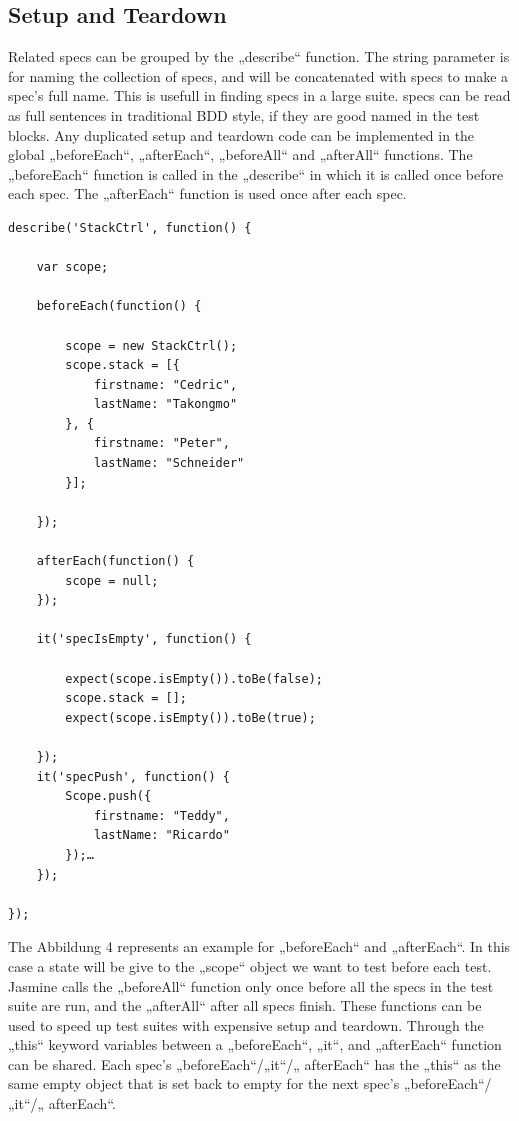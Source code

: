 \documentclass[11pt]{article}
\begin{document}
\subsection{Setup and Teardown}

Related specs can be grouped by the „describe“ function. The string parameter is for naming the collection of specs, and will be concatenated with specs to make a spec’s full name. This is usefull in finding specs in a large suite. specs can be read as full sentences in traditional BDD style, if they are good named in the test blocks. Any duplicated setup and teardown code can be implemented in the global „beforeEach“, „afterEach“, „beforeAll“ and „afterAll“ functions. The „beforeEach“ function is called in the „describe“ in which it is called once before each spec. The „afterEach“ function is used once after each spec.

\begin{lstlisting}[caption=Setup and Teardown]
describe('StackCtrl', function() {

    var scope;

    beforeEach(function() {

        scope = new StackCtrl();
        scope.stack = [{
            firstname: "Cedric",
            lastName: "Takongmo"
        }, {
            firstname: "Peter",
            lastName: "Schneider"
        }];

    });

    afterEach(function() {
        scope = null;
    });

    it('specIsEmpty', function() {

        expect(scope.isEmpty()).toBe(false);
        scope.stack = [];
        expect(scope.isEmpty()).toBe(true);

    });
    it('specPush', function() {
        Scope.push({
            firstname: "Teddy",
            lastName: "Ricardo"
        });…
    });

});
\end{lstlisting}

The Abbildung 4 represents an example for „beforeEach“ and „afterEach“. In this case a state will be give to the „scope“ object we want to test before each test. Jasmine calls the „beforeAll“ function only once before all the specs in the test suite are run, and the „afterAll“ after all specs finish. These functions can be used to speed up test suites with expensive setup and teardown. Through the „this“ keyword variables between a „beforeEach“, „it“, and „afterEach“ function can be shared. Each spec’s „beforeEach“/„it“/„ afterEach“ has the „this“ as the same empty object that is set back to empty for the next spec’s „beforeEach“/„it“/„ afterEach“.
\end{document}
